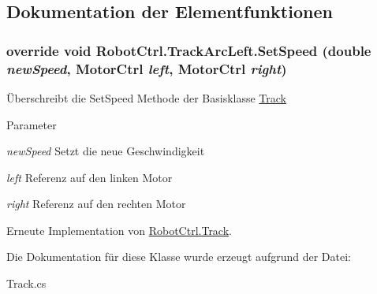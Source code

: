 \subsection{Dokumentation der Elementfunktionen}
\hypertarget{class_robot_ctrl_1_1_track_arc_left_aee8e8c1da176807436c2946e39bbd6ae}{
\subsubsection[{SetSpeed}]{\setlength{\rightskip}{0pt plus 5cm}override void RobotCtrl.TrackArcLeft.SetSpeed (double {\em newSpeed}, \/  {\bf MotorCtrl} {\em left}, \/  {\bf MotorCtrl} {\em right})}}
\label{class_robot_ctrl_1_1_track_arc_left_aee8e8c1da176807436c2946e39bbd6ae}
\"{U}berschreibt die SetSpeed Methode der Basisklasse \hyperlink{class_robot_ctrl_1_1_track}{Track}


\begin{DoxyParams}{Parameter}
\item[{\em newSpeed}]Setzt die neue Geschwindigkeit \item[{\em left}]Referenz auf den linken Motor \item[{\em right}]Referenz auf den rechten Motor \end{DoxyParams}


Erneute Implementation von \hyperlink{class_robot_ctrl_1_1_track_a9abc3ccf4bf1d9db8d461f2cb4b4b0d3}{RobotCtrl.Track}.



Die Dokumentation für diese Klasse wurde erzeugt aufgrund der Datei:\begin{DoxyCompactItemize}
\item 
Track.cs\end{DoxyCompactItemize}
